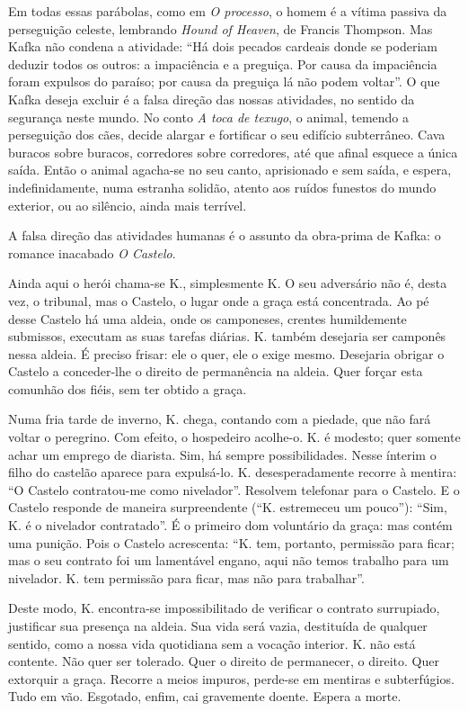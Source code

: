 Em todas essas parábolas,
como em \textit{O processo}, o homem é a vítima passiva da perseguição celeste,
lembrando \textit{Hound of Heaven}, de Francis Thompson. Mas Kafka não condena a
atividade: ``Há dois pecados cardeais donde se poderiam deduzir todos
os outros: a impaciência e a preguiça. Por causa da impaciência foram
expulsos do paraíso; por causa da preguiça lá não podem voltar''. O que Kafka deseja excluir é a falsa direção das nossas atividades, no sentido
da segurança neste mundo. No conto \textit{A toca de texugo}, o animal, temendo a perseguição dos
cães, decide alargar e fortificar o seu edifício subterrâneo. Cava
buracos sobre buracos, corredores sobre corredores, até que afinal esquece a única saída. Então o animal agacha-se no seu canto,
aprisionado e sem saída, e espera, indefinidamente, numa estranha solidão, atento aos ruídos funestos do mundo exterior, ou ao silêncio,
ainda mais terrível.

A falsa direção das atividades humanas é o assunto
da obra-prima de Kafka: o romance inacabado \textit{O Castelo}.

Ainda aqui o herói chama-se K., simplesmente K. O seu adversário não é, desta vez, o
tribunal, mas o Castelo, o lugar onde a graça está concentrada. Ao pé
desse Castelo há uma aldeia, onde os camponeses, crentes humildemente submissos, executam as suas tarefas diárias. K. também desejaria ser camponês nessa
aldeia. É preciso frisar: ele o quer, ele o exige mesmo. Desejaria obrigar o Castelo a conceder-lhe o direito de permanência na aldeia. Quer forçar esta comunhão dos fiéis, sem ter obtido a graça.

Numa fria tarde de inverno, K. chega, contando
com a piedade, que não fará voltar o peregrino. Com efeito, o hospedeiro
acolhe-o. K. é modesto; quer somente achar um emprego de diarista.
Sim, há sempre possibilidades. Nesse ínterim o filho do castelão aparece
para expulsá-lo. K. desesperadamente recorre à mentira: ``O Castelo contratou-me como nivelador''. Resolvem telefonar para o Castelo. E o
Castelo responde de maneira surpreendente (``K. estremeceu um pouco''): ``Sim, K. é o nivelador contratado''. É o primeiro dom voluntário da graça: mas
contém uma punição. Pois o Castelo acrescenta: ``K. tem, portanto,
permissão para ficar; mas o seu contrato foi um lamentável engano, aqui
não temos trabalho para um nivelador. K. tem permissão para ficar, mas
não para trabalhar''.

Deste modo, K. encontra-se impossibilitado de
verificar o contrato surrupiado, justificar sua presença na aldeia. Sua
vida será vazia, destituída de qualquer sentido, como a nossa vida
quotidiana sem a vocação interior. K. não está contente. Não quer ser
tolerado. Quer o direito de permanecer, o direito. Quer extorquir a
graça. Recorre a meios impuros, perde-se em mentiras e subterfúgios.
Tudo em vão. Esgotado, enfim, cai gravemente doente. Espera a morte.

